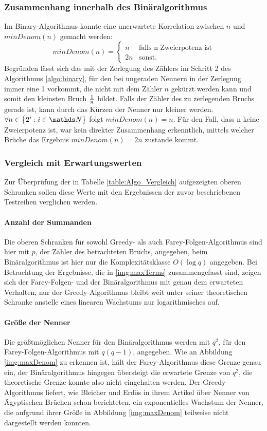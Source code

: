 \subsubsection{Zusammenhang innerhalb des Binäralgorithmus}
Im Binary-Algorithmus konnte eine unerwartete Korrelation zwischen $n$ und $minDenom(n)$ gemacht werden:
\begin{equation*}
	minDenom(n) = 
	\begin{cases}
		n & \text{falls n Zweierpotenz ist} \\
		2n & \text{sonst.}
	\end{cases}
\end{equation*}
Begründen lässt sich das mit der Zerlegung des Zählers im Schritt 2 des Algorithmus \ref{algo:binary}, für den bei ungeraden Nennern in der Zerlegung immer eine 1 vorkommt, die nicht mit dem Zähler $n$ gekürzt werden kann und somit den kleinsten Bruch $\frac{1}{n}$ bildet. Falls der Zähler des zu zerlegenden Bruchs gerade ist, kann durch das Kürzen der Nenner nur kleiner werden. $\forall n \in \left\{2^i : i\in \N \right\}$ folgt $minDenom(n) = n$. Für den Fall, dass n keine Zweierpotenz ist, war kein direkter Zusammenhang erkenntlich, mittels welcher Brüche das Ergebnis $minDenom(n) = 2n$ zustande kommt.

\subsubsection{Vergleich mit Erwartungswerten}
Zur Überprüfung der in Tabelle \ref{table:Algo_Vergleich} aufgezeigten oberen Schranken sollen diese Werte mit den Ergebnissen der zuvor beschriebenen Testreihen verglichen werden.

\paragraph{Anzahl der Summanden}Die oberen Schranken für sowohl Greedy- als auch Farey-Folgen-Algorithmus sind hier mit $p$, der Zähler des betrachteten Bruchs, angegeben, beim Binäralgorithmus ist hier nur die Komplexitätsklasse $O(\log q)$ angegeben. Bei Betrachtung der Ergebnisse, die in \ref{img:maxTerms} zusammengefasst sind, zeigen sich der Farey-Folgen- und der Binäralgorithmus mit genau dem erwarteten Verhalten, nur der Greedy-Algorithmus bleibt weit unter seiner theoretischen Schranke anstelle eines linearen Wachstums nur logarithmisches auf.
\paragraph{Größe der Nenner}Die größtmöglichen Nenner für den Binäralgorithmus werden mit $q^2$, für den Farey-Folgen-Algorithmus mit $q(q-1)$, angegeben. Wie an Abbildung \ref{img:maxDenom} zu erkennen ist, hält der Farey-Algorithmus diese Grenze genau ein, der Binäralgorithmus hingegen übersteigt die erwartete Grenze von $q^2$, die theoretische Grenze konnte also nicht eingehalten werden. Der Greedy-Algorithmus liefert, wie Bleicher und Erdös in ihrem Artikel über Nenner von Ägyptischen Brüchen schon berichteten, ein exponentielles Wachstum der Nenner, die aufgrund ihrer Größe in Abbildung \ref{img:maxDenom} teilweise nicht dargestellt werden konnten.

